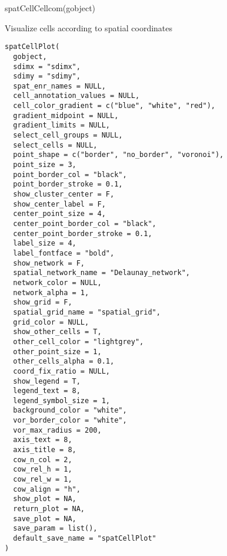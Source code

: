 \documentclass[a4paper]{book}
\begin{document}
%
\begin{Examples}
\begin{ExampleCode}
    spatCellCellcom(gobject)
\end{ExampleCode}
\end{Examples}
%
\begin{Description}\relax
Visualize cells according to spatial coordinates
\end{Description}
%
\begin{Usage}
\begin{verbatim}
spatCellPlot(
  gobject,
  sdimx = "sdimx",
  sdimy = "sdimy",
  spat_enr_names = NULL,
  cell_annotation_values = NULL,
  cell_color_gradient = c("blue", "white", "red"),
  gradient_midpoint = NULL,
  gradient_limits = NULL,
  select_cell_groups = NULL,
  select_cells = NULL,
  point_shape = c("border", "no_border", "voronoi"),
  point_size = 3,
  point_border_col = "black",
  point_border_stroke = 0.1,
  show_cluster_center = F,
  show_center_label = F,
  center_point_size = 4,
  center_point_border_col = "black",
  center_point_border_stroke = 0.1,
  label_size = 4,
  label_fontface = "bold",
  show_network = F,
  spatial_network_name = "Delaunay_network",
  network_color = NULL,
  network_alpha = 1,
  show_grid = F,
  spatial_grid_name = "spatial_grid",
  grid_color = NULL,
  show_other_cells = T,
  other_cell_color = "lightgrey",
  other_point_size = 1,
  other_cells_alpha = 0.1,
  coord_fix_ratio = NULL,
  show_legend = T,
  legend_text = 8,
  legend_symbol_size = 1,
  background_color = "white",
  vor_border_color = "white",
  vor_max_radius = 200,
  axis_text = 8,
  axis_title = 8,
  cow_n_col = 2,
  cow_rel_h = 1,
  cow_rel_w = 1,
  cow_align = "h",
  show_plot = NA,
  return_plot = NA,
  save_plot = NA,
  save_param = list(),
  default_save_name = "spatCellPlot"
)
\end{verbatim}
\end{Usage}
%
\end{document}

